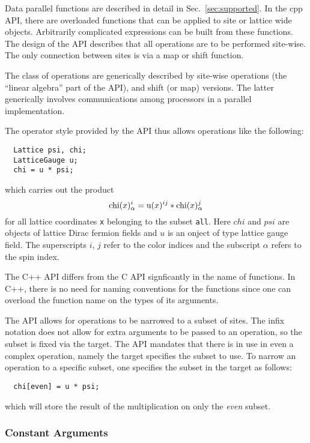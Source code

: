 \documentclass[12pt,letterpaper]{article}
\newcommand{\cpp}{C++}
\begin{document}
Data parallel functions are described in detail in
Sec.~\ref{sec:supported}.  
In the cpp{} API, there are overloaded functions that can be applied
to site or lattice wide objects. Arbitrarily complicated expressions
can be built from these functions.  The design of the API describes
that all operations are to be performed site-wise. The only connection
between sites is via a map or shift function.

The class of operations are generically described by site-wise
operations (the ``linear algebra'' part of the API), and shift (or
map) versions. The latter generically involves communications among
processors in a parallel implementation.

The operator style provided by the API thus allows operations like
the following:
%
\begin{verbatim}
  Lattice psi, chi;
  LatticeGauge u;
  chi = u * psi;
\end{verbatim}
%
which carries out the product
%
\begin{displaymath}
{\rm chi}(x)_\alpha^{i} = {\rm u}(x)^{i j} * {\rm chi}(x)_\alpha^{j}
\end{displaymath}
%
for all lattice coordinates {\tt x} belonging to the subset {\tt all}.
Here $chi$ and $psi$ are objects of lattice Dirac fermion
fields and $u$ is an onject of type lattice gauge field. The superscripts
$i$, $j$ refer to the color indices and the subscript $\alpha$ refers to the
spin index.


The \cpp{} API differs from the C API signficantly in the name of
functions. In \cpp{}, there is no need for naming conventions for
the functions since one can overload the function name on the types
of its arguments. 

The API allows for operations to be narrowed to a subset of sites.
The infix notation does not allow for extra arguments to be passed to
an operation, so the subset is fixed via the target.  
The API mandates that there is in use in even a complex 
operation, namely the target specifies the subset to use. 
To narrow an operation to a specific subset, one
specifies the subset in the target as follows:
%
\begin{verbatim}
  chi[even] = u * psi;
\end{verbatim}
%
which will store the result of the multiplication on only the 
{\em even} subset.


\subsubsection{Constant Arguments}
\end{document}
